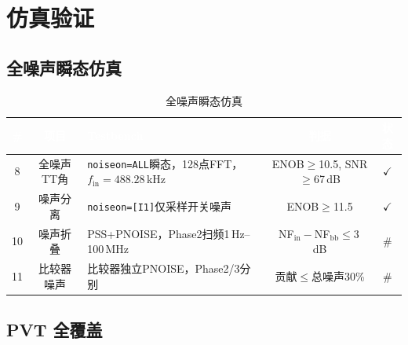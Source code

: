 \documentclass[12pt,a4paper,fontset=none]{ctexart}
\newcommand{\needtable}{\needspace{6cm}}   %
\begin{document}
\newpage
\section{仿真验证}

\needtable
\subsection{全噪声瞬态仿真}

\begin{table}[H]
\centering
\caption{全噪声瞬态仿真}
\footnotesize
\begin{tabular}{@{}cclcc@{}}
\toprule
\rowcolor{tabhead}
\textcolor{white}{\textbf{\#}} &
\textcolor{white}{\textbf{项目}} &
\textcolor{white}{\textbf{Testbench}} &
\textcolor{white}{\textbf{判据}} &
\textcolor{white}{\textbf{状态}} \\
\midrule
8 & 全噪声TT角 & \texttt{noiseon=ALL}瞬态，128点FFT，$f_{\mathrm{in}}\!=\!488.28$\,kHz & ENOB$\ge$10.5, SNR$\ge$67\,dB & \cellcolor{mygreen}$\checkmark$ \\
9 & 噪声分离 & \texttt{noiseon=[I1]}仅采样开关噪声 & ENOB$\ge$11.5 & \cellcolor{mygreen}$\checkmark$ \\
10 & 噪声折叠 & PSS+PNOISE，Phase2扫频1\,Hz--100\,MHz & NF$_{\mathrm{in}}\!-\!$NF$_{\mathrm{bb}}\!\le\!3$\,dB & \cellcolor{myred}\# \\
11 & 比较器噪声 & 比较器独立PNOISE，Phase2/3分别 & 贡献$\le$总噪声30\% & \cellcolor{myred}\# \\
\bottomrule
\end{tabular}
\end{table}

\needtable
\subsection{PVT 全覆盖}
\end{document}
